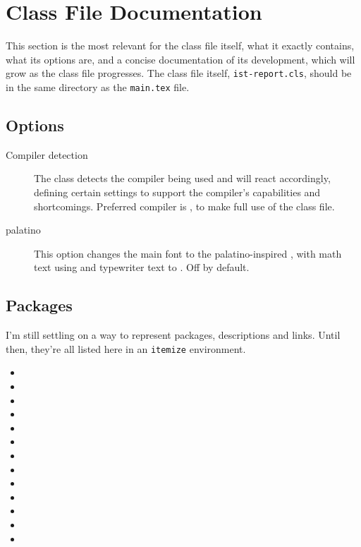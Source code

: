 \section{Class File Documentation}

This section is the most relevant for the class file itself, what it exactly contains, what its options are, and a concise documentation of its development, which will grow as the class file progresses. The class file itself, \texttt{ist-report.cls}, should be in the same directory as the \texttt{main.tex} file.

\subsection{Options}

\begin{description}
	\item[Compiler detection] The class detects the compiler being used and will react accordingly, defining certain settings to support the compiler's capabilities and shortcomings. Preferred compiler is , to make full use of the class file\footnotemark{}. 
	\item[palatino] This option changes the main font to the palatino-inspired , with math text using  and typewriter text to . Off by default.
\end{description}

\subsection{Packages}

I'm still settling on a way to represent packages, descriptions and links. Until then, they're all listed here in an \texttt{itemize} environment.
\begin{itemize}
	\item {}
	\item {}
	\item {}
	\item {}
	\item {}
	\item {}
	\item {}
	\item {}
	\item {}
	\item {}
	\item {}
	\item {}
	\item {}
\end{itemize}

